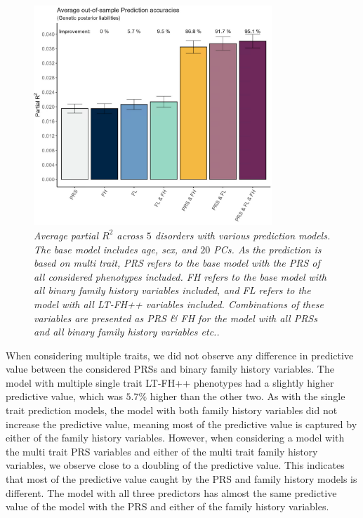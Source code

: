 \begin{figure}[h]
	\centering
	\includegraphics[width=0.8\textwidth]{results/avg_partial_prediciton_accuracies_multi_trait.png}
	\caption[Average out-of-sample prediction for multi trait]{
		\sl Average partial $ R^2 $ across $ 5 $ disorders with various prediction models. The base model includes age, sex, and $ 20 $ PCs. As the prediction is based on multi trait, \textit{PRS} refers to the base model with the PRS of all considered phenotypes included. \textit{FH} refers to the base model with all binary family history variables included, and \textit{FL} refers to the model with all LT-FH++ variables included. Combinations of these variables are presented as \textit{PRS} \& \textit{FH} for the model with all PRSs and all binary family history variables etc..}
	\label{fig:paper3:predictionResultsMultiTrait}
\end{figure}

When considering multiple traits, we did not observe any difference in predictive value between the considered PRSs and binary family history variables. The model with multiple single trait LT-FH++ phenotypes had a slightly higher predictive value, which was $ 5.7\% $ higher than the other two. As with the single trait prediction models, the model with both family history variables did not increase the predictive value, meaning most of the predictive value is captured by either of the family history variables. However, when considering a model with the multi trait PRS variables and either of the multi trait family history variables, we observe close to a doubling of the predictive value. This indicates that most of the predictive value caught by the PRS and family history models is different. The model with all three predictors has almost the same predictive value of the model with the PRS and either of the family history variables.


